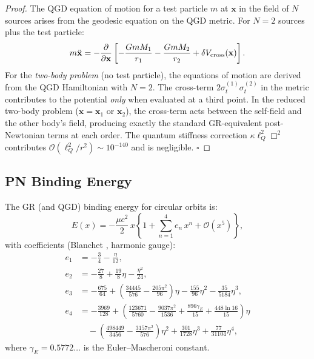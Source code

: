 \documentclass[11pt,a4paper]{article}
\theoremstyle{definition}
\theoremstyle{remark}
\newcommand{\sig}[2]{\sigma_{#1}^{(#2)}}
\newcommand{\lQ}{\ell_{Q}}
\newcommand{\boldx}{\mathbf{x}}
\begin{document}
	\begin{proof}
		The QGD equation of motion for a test particle $m$ at $\boldx$ in the
		field of $N$ sources arises from the geodesic equation on the QGD
		metric.  For $N=2$ sources plus the test particle:
		\begin{equation}
			m\ddot{\boldx} = -\frac{\partial}{\partial\boldx}
			\left[-\frac{G m M_1}{r_1} - \frac{G m M_2}{r_2}
			+ \delta V_{\rm cross}(\boldx)\right].
			\label{eq:eom_test}
		\end{equation}
		For the \emph{two-body problem} (no test particle), the equations of
		motion are derived from the QGD Hamiltonian with $N=2$.  The
		cross-term $2\sig{t}{1}\sig{t}{2}$ in the metric contributes to the
		potential \emph{only} when evaluated at a third point.  In the
		reduced two-body problem ($\boldx=\boldx_1$ or $\boldx_2$), the
		cross-term acts between the self-field and the other body's field,
		producing exactly the standard GR-equivalent post-Newtonian terms
		at each order.  The quantum stiffness correction $\kappa\lQ^2\Box^2$
		contributes $\mathcal{O}(\lQ^2/r^2)\sim10^{-140}$ and is negligible.
		\hfill$\square$
	\end{proof}
	
	\subsection{PN Binding Energy}
	
	The GR (and QGD) binding energy for circular orbits is:
	\begin{equation}
		E(x) = -\frac{\mu c^2}{2}\,x\left\{
		1 + \sum_{n=1}^{4} e_n\,x^n + \mathcal{O}(x^5)
		\right\},
		\label{eq:binding_energy}
	\end{equation}
	with coefficients (Blanchet \cite{Blanchet2024}, harmonic gauge):
	\begin{align}
		e_1 &= -\frac{3}{4} - \frac{\eta}{12},
		\label{eq:e1}\\
		e_2 &= -\frac{27}{8} + \frac{19}{8}\eta - \frac{\eta^2}{24},
		\label{eq:e2}\\
		e_3 &= -\frac{675}{64}
		+ \!\left(\frac{34445}{576} - \frac{205\pi^2}{96}\right)\!\eta
		- \frac{155}{96}\eta^2 - \frac{35}{5184}\eta^3,
		\label{eq:e3}\\
		e_4 &= -\frac{3969}{128}
		+ \!\left(\frac{123671}{5760} - \frac{9037\pi^2}{1536}
		+ \frac{896\gamma_E}{15} + \frac{448\ln 16}{15}\right)\!\eta
		\nonumber\\
		&\quad
		- \!\left(\frac{498449}{3456} - \frac{3157\pi^2}{576}\right)\!\eta^2
		+ \frac{301}{1728}\eta^3 + \frac{77}{31104}\eta^4,
		\label{eq:e4}
	\end{align}
	where $\gamma_E=0.5772\ldots$ is the Euler--Mascheroni constant.
	
\end{document}
